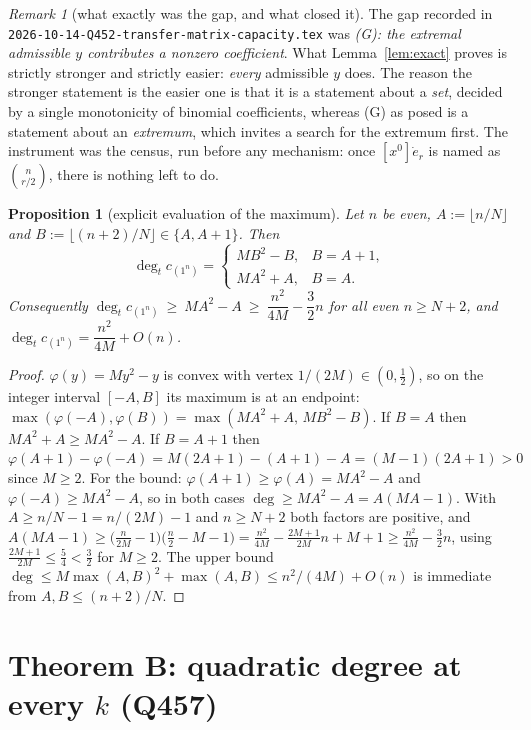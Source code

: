 \documentclass[11pt]{article}
\theoremstyle{plain}
\newtheorem{proposition}[theorem]{Proposition}
\theoremstyle{definition}
\theoremstyle{remark}
\newtheorem{remark}[theorem]{Remark}
\newcommand{\edot}{\dot{e}}
\newcommand{\onen}{(1^{n})}
\begin{document}
\begin{remark}[what exactly was the gap, and what closed it]
The gap recorded in \texttt{2026-10-14-Q452-transfer-matrix-capacity.tex} was
\emph{(G): the extremal admissible $y$ contributes a nonzero coefficient}. What
Lemma~\ref{lem:exact} proves is strictly stronger and strictly easier: \emph{every}
admissible $y$ does. The reason the stronger statement is the easier one is that it is a
statement about a \emph{set}, decided by a single monotonicity of binomial coefficients,
whereas (G) as posed is a statement about an \emph{extremum}, which invites a search for
the extremum first. The instrument was the census, run before any mechanism: once
$[x^0]\edot_r$ is named as $\binom{n}{r/2}$, there is nothing left to do.
\end{remark}

\begin{proposition}[explicit evaluation of the maximum]\label{prop:explicit}
Let $n$ be even, $A:=\lfloor n/N\rfloor$ and $B:=\lfloor (n+2)/N\rfloor\in\{A,A+1\}$. Then
\[
  \deg_t c_\onen=\begin{cases} MB^2-B, & B=A+1,\\[2pt] MA^2+A, & B=A.\end{cases}
\]
Consequently $\deg_t c_\onen\ \ge\ MA^2-A\ \ge\ \dfrac{n^2}{4M}-\dfrac32 n$ for all even
$n\ge N+2$, and $\deg_t c_\onen=\dfrac{n^2}{4M}+O(n)$.
\end{proposition}

\begin{proof}
$\varphi(y)=My^2-y$ is convex with vertex $1/(2M)\in(0,\tfrac12)$, so on the integer
interval $[-A,B]$ its maximum is at an endpoint: $\max(\varphi(-A),\varphi(B))
=\max(MA^2+A,\,MB^2-B)$. If $B=A$ then $MA^2+A\ge MA^2-A$. If $B=A+1$ then
$\varphi(A+1)-\varphi(-A)=M(2A+1)-(A+1)-A=(M-1)(2A+1)>0$ since $M\ge2$.
For the bound: $\varphi(A+1)\ge\varphi(A)=MA^2-A$ and $\varphi(-A)\ge MA^2-A$, so in both
cases $\deg\ge MA^2-A=A(MA-1)$. With $A\ge n/N-1=n/(2M)-1$ and $n\ge N+2$ both factors are
positive, and
$A(MA-1)\ge\bigl(\tfrac{n}{2M}-1\bigr)\bigl(\tfrac n2-M-1\bigr)
=\tfrac{n^2}{4M}-\tfrac{2M+1}{2M}n+M+1\ge\tfrac{n^2}{4M}-\tfrac32 n$,
using $\tfrac{2M+1}{2M}\le\tfrac54<\tfrac32$ for $M\ge2$. The upper bound
$\deg\le M\max(A,B)^2+\max(A,B)\le n^2/(4M)+O(n)$ is immediate from $A,B\le (n+2)/N$.
\end{proof}

\section{Theorem B: quadratic degree at every $k$ (Q457)}\label{sec:B}
\end{document}

